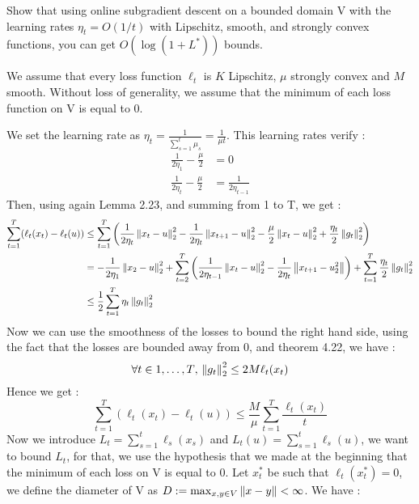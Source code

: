 \begin{exercise}[]{}
	Show that using online subgradient descent on a bounded domain V with the learning rates $ \eta_t = O(1/t) $ with Lipschitz, smooth, and strongly convex functions, you can get $ O(\log(1+L^{*})) $ bounds.
\end{exercise}

\begin{solution}[]
	We assume that every loss function $ \ell_t $ is $ K $ Lipschitz, $ \mu $ strongly convex and $ M $ smooth. Without loss of generality, we assume that the minimum of each loss function on V is equal to $ 0 $.

	We set the learning rate as $ \eta_t = \frac{1}{\sum_{s=1}^{t} \mu_s} = \frac{1}{\mu t}$. This learning rates verify :
\begin{align*}
	\frac{1}{2 \eta_1} - \frac{\mu}{2} &= 0 \\
	\frac{1}{2 \eta_t} - \frac{\mu}{2} &= \frac{1}{2\eta_{t-1}}
\end{align*}
Then, using again Lemma 2.23, and summing from 1 to T, we get :
\begin{align*}
	\sum_{t=1}^{T}(\ell_t(x_t) - \ell_t(u)) &\leq \sum_{t=1}^{T}\left( \frac{1}{2\eta_t}\left\|x_t-u\right\|_2^2 - \frac{1}{2\eta_t}\left\|x_{t+1}-u\right\|_2^2 - \frac{\mu}{2}\left\|x_t-u\right\|_2^2+\frac{\eta_t}{2}\left\|g_t\right\|_2^2 \right) \\
						&= -\frac{1}{2\eta_1}\left\|x_2-u\right\|_2^2 + \sum_{t=2}^{T}\left( \frac{1}{2\eta_{t-1}}\left\|x_t-u\right\|_2^2-\frac{1}{2\eta_t}\left\|x_{t+1}-u_2^2\right\| \right) + \sum_{t=1}^{T}\frac{\eta_t}{2}\left\|g_t\right\|_2^2 \\
						&\leq \frac{1}{2}\sum_{t=1}^{T} \eta_t \left\|g_t\right\|_2^2
\end{align*}
Now we can use the smoothness of the losses to bound the right hand side, using the fact that the losses are bounded away from 0, and theorem 4.22, we have :
\begin{equation*}
	\forall t \in {1,\ldots,T},\, \left\|g_t\right\|_2^2 \leq 2M\ell_t(x_t)
\end{equation*}
Hence we get :
\begin{equation*}
	\sum_{t=1}^{T}(\ell_t(x_t)-\ell_t(u)) \leq\frac{M}{\mu} \sum_{t=1}^{T} \frac{\ell_t(x_t)}{t}
\end{equation*}
Now we introduce $ L_t = \sum_{s=1}^{t}\ell_s(x_s) $ and $ L_t(u) = \sum_{s=1}^{t}\ell_s(u) $, we want to bound $ L_t $, for that, we use the hypothesis that we made at the beginning that the minimum of each loss on V is equal to 0. Let $ x_t^{*} $ be such that $ \ell_t(x_t^{*}) = 0 $, we define the diameter of V as $ D := \max_{x,y\in V}\left\|x-y\right\| < \infty $. We have :

\end{solution}
